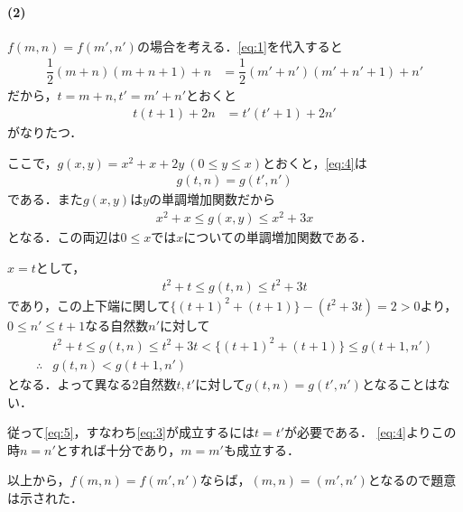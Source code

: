 \documentclass[../../main.tex]{subfiles}
\begin{document}
\paragraph{(2)}

$f(m,n)=f(m',n')$の場合を考える．\cref{eq:1}を代入すると
\begin{align}
  \dfrac{1}{2}(m+n)(m+n+1)+n&=\dfrac{1}{2}(m'+n')(m'+n'+1)+n' \label{eq:3}
\end{align}
だから，$t=m+n, t'=m'+n'$とおくと
\begin{align}
  t(t+1)+2n&=t'(t'+1)+2n' \label{eq:4}
\end{align}
がなりたつ．

ここで，$g(x,y)=x^2+x+2y\ (0\le y\le x)$とおくと，\cref{eq:4}は
\begin{align}
  g(t,n) = g(t',n') \label{eq:5}
\end{align}
である．また$g(x,y)$は$y$の単調増加関数だから
\begin{align}
  x^2+x\le g(x,y)\le x^2+3x
\end{align}
となる．この両辺は$0\le x$では$x$についての単調増加関数である．

$x=t$として，
\begin{align}
  t^2+t\le g(t,n)\le t^2+3t
\end{align}
であり，この上下端に関して$\{(t+1)^2+(t+1)\}-(t^2+3t)=2>0$より，$0 \le n' \le t+1$なる自然数$n'$に対して
\begin{align}
  & t^2+t\le g(t,n)\le t^2+3t < \{(t+1)^2+(t+1)\} \le g(t+1,n') \\
  \therefore
  & g(t, n) < g(t+1,n')
\end{align}
となる．よって異なる2自然数$t,t'$に対して$g(t,n)=g(t',n')$となることはない．

従って\cref{eq:5}，すなわち\cref{eq:3}が成立するには$t=t'$が必要である．
\cref{eq:4}よりこの時$n=n'$とすれば十分であり，$m=m'$も成立する．

以上から，$f(m,n)=f(m',n')$ならば，$(m,n)=(m',n')$となるので題意は示された．

\newpage
\end{document}
